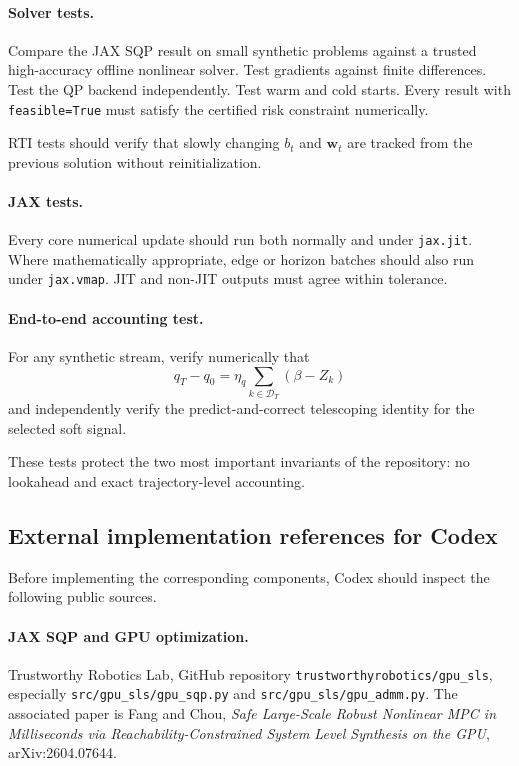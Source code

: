 \documentclass[11pt]{article}
\begin{document}
\paragraph{Solver tests.}
Compare the JAX SQP result on small synthetic problems against a trusted
high-accuracy offline nonlinear solver.  Test gradients against finite
differences.  Test the QP backend independently.  Test warm and cold starts.
Every result with \texttt{feasible=True} must satisfy the certified risk
constraint numerically.

RTI tests should verify that slowly changing $b_t$ and $\bm w_t$ are tracked
from the previous solution without reinitialization.

\paragraph{JAX tests.}
Every core numerical update should run both normally and under
\texttt{jax.jit}.  Where mathematically appropriate, edge or horizon batches
should also run under \texttt{jax.vmap}.  JIT and non-JIT outputs must agree
within tolerance.

\paragraph{End-to-end accounting test.}
For any synthetic stream, verify numerically that
\[
    q_T-q_0
    =
    \eta_q
    \sum_{k\in\mathcal D_T}
    (\beta-Z_k)
\]
and independently verify the predict-and-correct telescoping identity for the
selected soft signal.

These tests protect the two most important invariants of the repository:
no lookahead and exact trajectory-level accounting.

\subsection{External implementation references for Codex}
\label{app:implementation-references}

Before implementing the corresponding components, Codex should inspect the
following public sources.

\paragraph{JAX SQP and GPU optimization.}
Trustworthy Robotics Lab,
GitHub repository
\texttt{trustworthyrobotics/gpu\_sls},
especially
\texttt{src/gpu\_sls/gpu\_sqp.py} and
\texttt{src/gpu\_sls/gpu\_admm.py}.
The associated paper is Fang and Chou,
\emph{Safe Large-Scale Robust Nonlinear MPC in Milliseconds via
Reachability-Constrained System Level Synthesis on the GPU},
arXiv:2604.07644.
\end{document}
